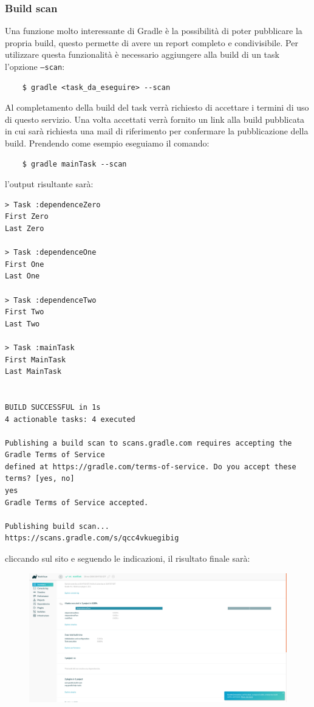 \subsubsection{Build scan}
Una funzione molto interessante di Gradle è la possibilità di poter pubblicare la propria build, questo permette di avere un report completo e condivisibile. Per utilizzare questa funzionalità è necessario aggiungere alla build di un task l'opzione \texttt{--scan}:
\begin{verbatim}    $ gradle <task_da_eseguire> --scan \end{verbatim}
Al completamento della build del task verrà richiesto di accettare i termini di uso di questo servizio. Una volta accettati verrà fornito un link alla build pubblicata in cui sarà richiesta una mail di riferimento per confermare la pubblicazione della build. Prendendo come esempio eseguiamo il comando:
\begin{verbatim}
    $ gradle mainTask --scan\end{verbatim}
l'output risultante sarà:
\begin{verbatim}
> Task :dependenceZero 
First Zero
Last Zero

> Task :dependenceOne 
First One
Last One

> Task :dependenceTwo 
First Two
Last Two

> Task :mainTask 
First MainTask
Last MainTask


BUILD SUCCESSFUL in 1s
4 actionable tasks: 4 executed

Publishing a build scan to scans.gradle.com requires accepting the Gradle Terms of Service 
defined at https://gradle.com/terms-of-service. Do you accept these terms? [yes, no] 
yes
Gradle Terms of Service accepted.

Publishing build scan...
https://scans.gradle.com/s/qcc4vkuegibig
\end{verbatim}
cliccando sul sito e seguendo le indicazioni, il risultato finale sarà:
\begin{figure}[H]
\includegraphics[scale=0.25]{1Task/insights/gradleScan.png}
\end{figure}